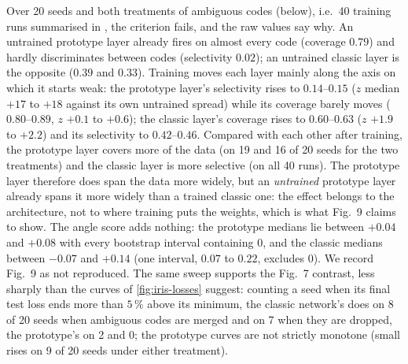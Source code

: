 Over 20 seeds and both treatments of ambiguous codes (below), i.e.\ 40 training runs
summarised in , the criterion fails, and the raw values say
why.  An untrained prototype layer already fires on almost every code (coverage $0.79$) and
hardly discriminates between codes (selectivity $0.02$); an untrained classic layer is the
opposite ($0.39$ and $0.33$).  Training moves each layer mainly along the axis on which it
starts weak: the prototype layer's selectivity rises to $0.14$--$0.15$ ($z$ median $+17$ to
$+18$ against its own untrained spread) while its coverage barely moves ($0.80$--$0.89$, $z$
$+0.1$ to $+0.6$); the classic layer's coverage rises to $0.60$--$0.63$ ($z$ $+1.9$ to $+2.2$)
and its selectivity to $0.42$--$0.46$.  Compared with each other after training, the prototype
layer covers more of the data (on 19 and 16 of 20 seeds for the two treatments) and the classic
layer is more selective (on all 40 runs).  The prototype layer therefore does span the data
more widely, but an \emph{untrained} prototype layer already spans it more widely than a
trained classic one: the effect belongs to the architecture, not to where training puts the
weights, which is what Fig.~9 claims to show.  The angle score adds nothing: the prototype
medians lie between $+0.04$ and $+0.08$ with every bootstrap interval containing $0$, and the
classic medians between $-0.07$ and $+0.14$ (one interval, $0.07$ to $0.22$, excludes $0$).  We
record Fig.~9 as not reproduced.  The same sweep supports the Fig.~7 contrast, less sharply than
the curves of \cref{fig:iris-losses} suggest: counting a seed when its final test loss ends more
than $5\,\%$ above its minimum, the classic network's does on 8 of 20 seeds when
ambiguous codes are merged and on 7 when they are dropped, the prototype's on 2 and 0; the prototype curves are
not strictly monotone (small rises on 9 of 20 seeds under either treatment).

